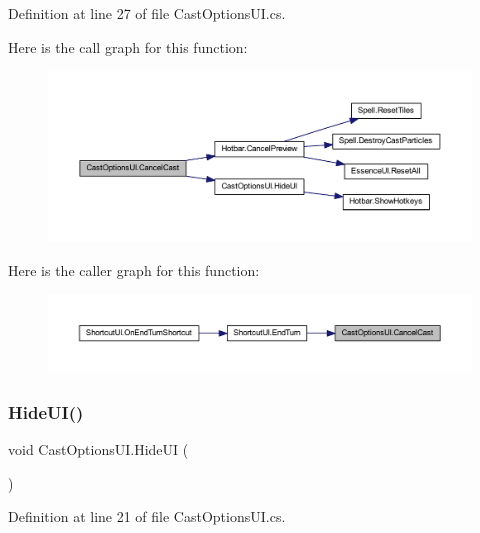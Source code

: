 Definition at line 27 of file Cast\+Options\+U\+I.\+cs.

Here is the call graph for this function\+:
\nopagebreak
\begin{figure}[H]
\begin{center}
\leavevmode
\includegraphics[width=350pt]{class_cast_options_u_i_a78fb30f53f8da2443cb801bd878dc149_cgraph}
\end{center}
\end{figure}
Here is the caller graph for this function\+:
\nopagebreak
\begin{figure}[H]
\begin{center}
\leavevmode
\includegraphics[width=350pt]{class_cast_options_u_i_a78fb30f53f8da2443cb801bd878dc149_icgraph}
\end{center}
\end{figure}
\mbox{\label{class_cast_options_u_i_affc98e48b03c51f4dddda5cb96920697}} 
\subsubsection{\texorpdfstring{HideUI()}{HideUI()}}
{\footnotesize\ttfamily void Cast\+Options\+U\+I.\+Hide\+UI (\begin{DoxyParamCaption}{ }\end{DoxyParamCaption})}



Definition at line 21 of file Cast\+Options\+U\+I.\+cs.

